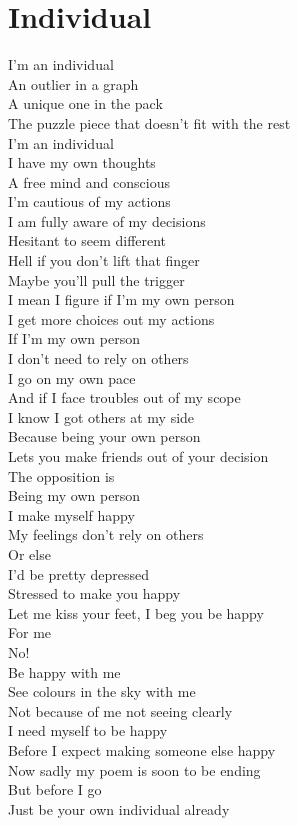 \documentclass[12pt, b5paper]{article}
\begin{document}
\section{Individual}
I'm an individual
\\An outlier in a graph
\\A unique one in the pack
\\The puzzle piece that doesn't fit with the rest
\\I'm an individual
\\I have my own thoughts
\\A free mind and conscious
\\I'm cautious of my actions
\\I am fully aware of my decisions
\\Hesitant to seem different
\\Hell if you don't lift that finger
\\Maybe you'll pull the trigger
\\I mean I figure if I'm my own person
\\I get more choices out my actions
\\If I'm my own person
\\I don't need to rely on others
\\I go on my own pace
\\And if I face troubles out of my scope
\\I know I got others at my side
\\Because being your own person
\\Lets you make friends out of your decision
\\The opposition is
\\Being my own person
\\I make myself happy
\\My feelings don't rely on others
\\Or else
\\I'd be pretty depressed
\\Stressed to make you happy
\\Let me kiss your feet, I beg you be happy
\\For me
\\No!
\\Be happy with me
\\See colours in the sky with me
\\Not because of me not seeing clearly
\\I need myself to be happy
\\Before I expect making someone else happy
\\Now sadly my poem is soon to be ending
\\But before I go
\\Just be your own individual already
\end{document}
